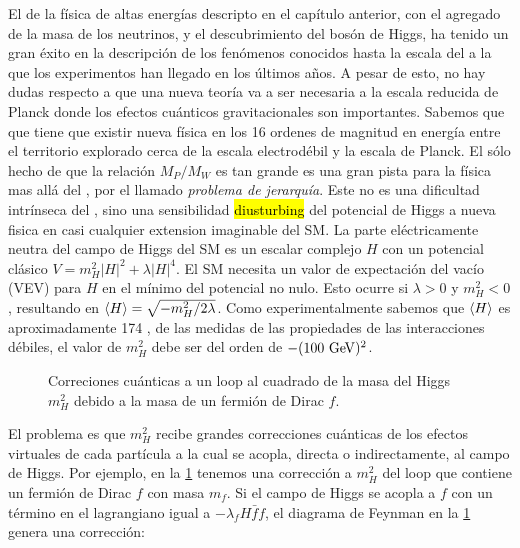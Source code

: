 El {\SM} de la física de altas energías descripto en el capítulo anterior,
con el agregado de la masa de los neutrinos, y el descubrimiento del bosón
de Higgs, ha tenido un gran éxito en la descripción de los fenómenos
conocidos hasta la escala del {\tev} a la que los experimentos han llegado
en los últimos a\~nos.
A pesar de esto, no hay dudas respecto a que una nueva teor\'ia va a ser
necesaria a la escala reducida de Planck %
donde los efectos cu\'anticos gravitacionales son importantes. Sabemos que
que tiene que existir nueva f\'isica en los 16 ordenes de magnitud en
energ\'ia entre el territorio explorado cerca de la escala electrod\'ebil
y la escala de Planck.
El s\'olo hecho de que la relación $M_P/M_W$ es tan grande es una gran pista
para la física mas allá del {\SM}, por el llamado \emph{problema de jerarquía}.
Este no es una dificultad intrínseca del {\SM}, sino una sensibilidad \hl{diusturbing}
del potencial de Higgs a nueva fisica en casi cualquier extension imaginable
del SM.
La parte eléctricamente neutra del campo de Higgs del SM es un escalar complejo
$H$ con un potencial clásico $V=m_H^2 |H|^2 + \lambda|H|^4$.
El SM necesita un valor de expectación del vacío (VEV) para $H$ en el
mínimo del potencial no nulo.
Esto ocurre si $\lambda>0$ y $m_H^2<0$, resultando en
$\langle H \rangle = \sqrt{-m_H^2/2\lambda}$.
Como experimentalmente sabemos que $\langle H \rangle$ es aproximadamente 174 \gev,
de las medidas de las propiedades de las interacciones débiles, el valor de
$m_H^2$ debe ser del orden de $-(100 \gev)^2$.

\begin{figure}[h]
  \centering
  
  \caption{Correciones cu\'anticas a un loop al cuadrado de la masa del Higgs
    $m_H^2$ debido a la masa de un fermi\'on de Dirac $f$.}
  \label{fig:higgs_correction_f}
\end{figure}

El problema es que $m_H^2$ recibe grandes correcciones cuánticas de los efectos
virtuales de cada partícula a la cual se acopla, directa o indirectamente, al
campo de Higgs. Por ejemplo, en la \cref{fig:higgs_correction_f} tenemos una
corrección a $m_H^2$ del loop que contiene un fermión de Dirac $f$ con masa
$m_f$. Si el campo de Higgs se acopla a $f$ con un término en el lagrangiano
igual a $-\lambda_f H \bar{f}f$, el diagrama de Feynman en la
\cref{fig:higgs_correction_f} genera una corrección:

